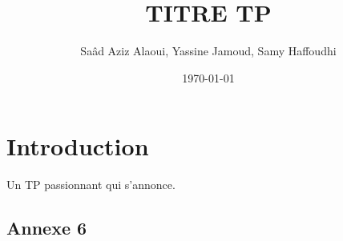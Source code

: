 \documentclass[12pt,a4paper,titlepage]{article}
\title{TITRE TP}
\author{Saâd Aziz Alaoui, Yassine Jamoud, Samy Haffoudhi}
\date{\today}
\begin{document}
\maketitle

\section*{Introduction}

Un TP passionnant qui s'annonce.


\begin{appendices}

    \section{Annexe 6}

\end{appendices}
\end{document}
